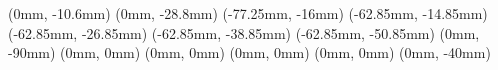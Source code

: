 \JoinCoffins \result \topBox
\JoinCoffins {} \pkuLogo[hc, b](0mm, -10.6mm)
\JoinCoffins {} \headingText[hc, b](0mm, -28.8mm)
\JoinCoffins {} \titleText[l, t](-77.25mm, -16mm)
\JoinCoffins {} \chineseTitleTextA[l, t](-62.85mm, -14.85mm)
\JoinCoffins {} \chineseTitleTextB[l, t](-62.85mm, -26.85mm)
\JoinCoffins {} \englishTitleTextA[l, t](-62.85mm, -38.85mm)
\JoinCoffins {} \englishTitleTextB[l, t](-62.85mm, -50.85mm)
\JoinCoffins {} \nameText[hc, t](0mm, -90mm)
\JoinCoffins {} \studentIDText[hc, t](0mm, 0mm)
\JoinCoffins {} \schoolText[hc, t](0mm, 0mm)
\JoinCoffins {} \majorText[hc, t](0mm, 0mm)
\JoinCoffins {} \advisorText[hc, t](0mm, 0mm)
\JoinCoffins {} \dateText[hc, t](0mm, -40mm)


\thispagestyle{empty}
\noindent\TypesetCoffin \result
\restoregeometry